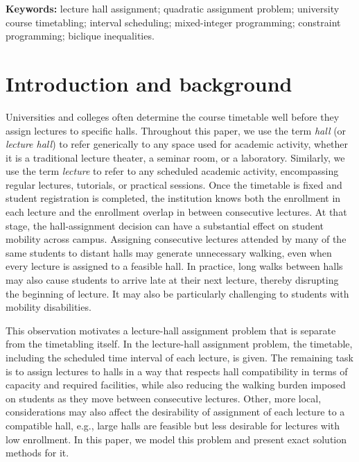 \documentclass[11pt]{article}
\begin{document}
\noindent\textbf{Keywords:} lecture hall assignment; quadratic assignment problem; university course timetabling; interval scheduling; mixed-integer programming; constraint programming; biclique inequalities.

\section{Introduction and background}
Universities and colleges often determine the course timetable well before they assign lectures to specific halls. Throughout this paper, we use the term \emph{hall} (or \emph{lecture hall}) to refer generically to any space used for academic activity, whether it is a traditional lecture theater, a seminar room, or a laboratory. Similarly, we use the term \emph{lecture} to refer to any scheduled academic activity, encompassing regular lectures, tutorials, or practical sessions. Once the timetable is fixed and student registration is completed, the institution knows both the enrollment in each lecture and the  enrollment overlap in between consecutive lectures. At that stage, the hall-assignment decision can have a substantial effect on student mobility across campus. Assigning consecutive lectures attended by many of the same students to distant halls may generate unnecessary walking, even when every lecture is assigned to a feasible hall. In practice, long walks between halls may also cause students to arrive late at their next lecture, thereby disrupting the beginning of lecture.  It may also be particularly challenging to students with mobility disabilities.

This observation motivates a lecture-hall assignment problem that is separate from the timetabling itself. In the lecture-hall assignment problem, the timetable, including the scheduled time interval of each lecture, is  given. The remaining task is to assign lectures to halls in a way that respects hall compatibility in terms of capacity and required facilities, while also reducing the walking burden imposed on students as they move between consecutive lectures. Other, more local, considerations may also affect the desirability of assignment of each lecture to a compatible hall, e.g., large halls are feasible but less desirable for lectures with low enrollment.   In this paper, we model this problem and present exact solution methods for it.
\end{document}
